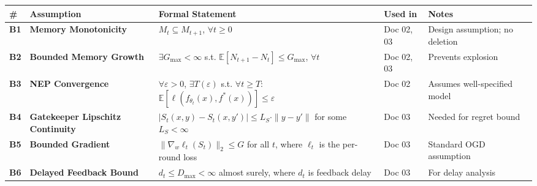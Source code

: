 \documentclass[
  12pt,
]{article}
\begin{document}
\begin{longtable}[]{@{}
  >{\raggedright\arraybackslash}p{}
  >{\raggedright\arraybackslash}p{}
  >{\raggedright\arraybackslash}p{}
  >{\raggedright\arraybackslash}p{}
  >{\raggedright\arraybackslash}p{}@{}}
\toprule\noalign{}
\begin{minipage}[b]{\linewidth}\raggedright
\#
\end{minipage} & \begin{minipage}[b]{\linewidth}\raggedright
Assumption
\end{minipage} & \begin{minipage}[b]{\linewidth}\raggedright
Formal Statement
\end{minipage} & \begin{minipage}[b]{\linewidth}\raggedright
Used in
\end{minipage} & \begin{minipage}[b]{\linewidth}\raggedright
Notes
\end{minipage} \\
\midrule\noalign{}
\endhead
\bottomrule\noalign{}
\endlastfoot
\textbf{B1} & \textbf{Memory Monotonicity} & \(M_t \subseteq M_{t+1}\),
\(\forall t \geq 0\) & Doc 02, 03 & Design assumption; no deletion \\
\textbf{B2} & \textbf{Bounded Memory Growth} &
\(\exists G_{\max} < \infty\) s.t.
\(\mathbb{E}[N_{t+1} - N_t] \leq G_{\max}\), \(\forall t\) & Doc 02, 03
& Prevents explosion \\
\textbf{B3} & \textbf{NEP Convergence} & \(\forall \varepsilon > 0\),
\(\exists T(\varepsilon)\) s.t. \(\forall t \geq T\):
\(\mathbb{E}[\ell(f_{\theta_t}(x), f^*(x))] \leq \varepsilon\) & Doc 02
& Assumes well-specified model \\
\textbf{B4} & \textbf{Gatekeeper Lipschitz Continuity} &
\(|S_t(x,y) - S_t(x,y')| \leq L_S \cdot \|y - y'\|\) for some
\(L_S < \infty\) & Doc 03 & Needed for regret bound \\
\textbf{B5} & \textbf{Bounded Gradient} &
\(\|\nabla_w \ell_t(S_t)\|_2 \leq G\) for all \(t\), where \(\ell_t\) is
the per-round loss & Doc 03 & Standard OGD assumption \\
\textbf{B6} & \textbf{Delayed Feedback Bound} &
\(d_t \leq D_{\max} < \infty\) almost surely, where \(d_t\) is feedback
delay & Doc 03 & For delay analysis \\
\end{longtable}
\end{document}

